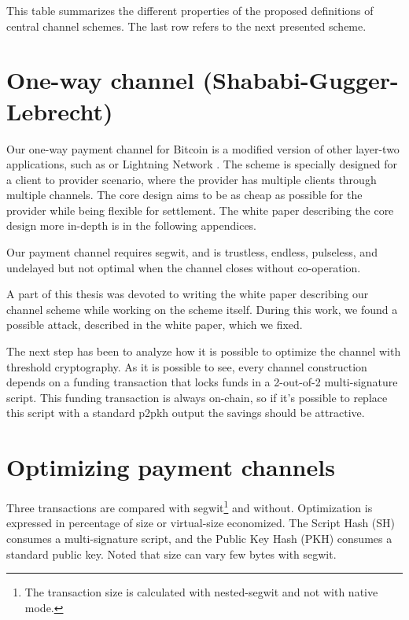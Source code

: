 This table summarizes the different properties of the proposed definitions of
central channel schemes. The last row refers to the next presented scheme.

\section{One-way channel (Shababi-Gugger-Lebrecht)}

Our one-way payment channel for Bitcoin is a modified version of other layer-two
applications, such as  or Lightning Network
\cite{poon2016bitcoin, YoursLightningProtocol}. The scheme is specially designed
for a client to provider scenario, where the provider has multiple clients
through multiple channels. The core design aims to be as cheap as possible for
the provider while being flexible for settlement. The white paper describing the
core design more in-depth is in the following appendices.

Our payment channel requires \gls{segwit}, and is trustless, endless, pulseless,
and undelayed but not optimal when the channel closes without co-operation.

A part of this thesis was devoted to writing the white paper describing our
channel scheme while working on the scheme itself. During this work, we found a
possible attack, described in the white paper, which we fixed.

The next step has been to analyze how it is possible to optimize the channel
with threshold cryptography. As it is possible to see, every channel
construction depends on a funding transaction that locks funds in a 2-out-of-2
multi-signature script. This funding transaction is always on-chain, so if it's
possible to replace this script with a standard \gls{p2pkh} output the savings
should be attractive.

\section{Optimizing payment channels}


Three transactions are compared with \gls{segwit}\footnote{ The transaction size
is calculated with nested-\gls{segwit} and not with native mode.} and without.
Optimization is expressed in percentage of size or virtual-size economized. The
Script Hash (SH) consumes a multi-signature script, and the Public Key Hash
(PKH) consumes a standard public key. Noted that size can vary few bytes with
\gls{segwit}.

